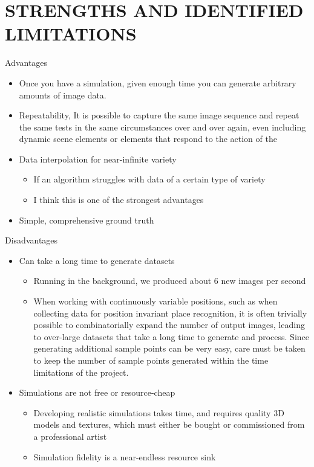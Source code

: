 \documentclass[letterpaper, 10 pt, conference]{ieeeconf}  %
\begin{document}
\section{STRENGTHS AND IDENTIFIED LIMITATIONS}

Advantages
\begin{itemize}
    \item Once you have a simulation, given enough time you can generate arbitrary amounts of image data.
    \item Repeatability, It is possible to capture the same image sequence and repeat the same tests in the same circumstances over and over again, even including dynamic scene elements or elements that respond to the action of the
    \item Data interpolation for near-infinite variety
    \begin{itemize}
        \item If an algorithm struggles with data of a certain type of variety
        \item I think this is one of the strongest advantages
    \end{itemize}
    \item Simple, comprehensive ground truth
\end{itemize}

Disadvantages
\begin{itemize}
    \item Can take a long time to generate datasets
    \begin{itemize}
        \item Running in the background, we produced about 6 new images per second
        \item When working with continuously variable positions, such as when collecting data for position invariant place recognition, it is often trivially possible to combinatorially expand the number of output images, leading to over-large datasets that take a long time to generate and process. Since generating additional sample points can be very easy, care must be taken to keep the number of sample points generated within the time limitations of the project.
    \end{itemize}
    \item Simulations are not free or resource-cheap
    \begin{itemize}
        \item Developing realistic simulations takes time, and requires quality 3D models and textures, which must either be bought or commissioned from a professional artist
        \item Simulation fidelity is a near-endless resource sink
    \end{itemize}
\end{itemize}
\end{document}
